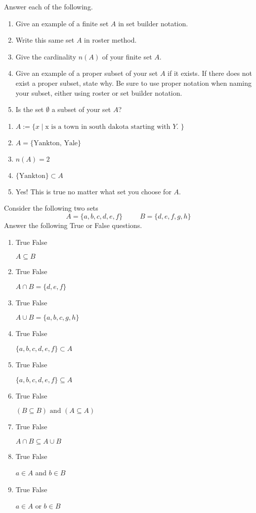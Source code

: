 \documentclass[addpoints,12pt]{exam}
\newcommand{\tft}{
\begin{oneparcheckboxes}
\CorrectChoice True
\choice False
	\end{oneparcheckboxes}
}
\newcommand{\tff}{
\begin{oneparcheckboxes}
\choice True
\CorrectChoice False
	\end{oneparcheckboxes}
}
\begin{document}
\begin{questions}
	\question Answer each of the following. \begin{enumerate}[label=\alph*)]
	    \item Give an example of a finite set $A$ in set builder notation. 
			\item Write this same set $A$ in roster method. 
			\item Give the cardinality $n(A)$ of your finite set $A$. 
			\item Give an example of a proper subset of your set $A$ if it exists. If there does not exist a proper subset, state why. Be sure to use proper notation when naming your subset, either using roster or set builder notation. 
			\item Is the set $\emptyset$ a subset of your set $A$?
	\end{enumerate}

	\begin{solution}
	    \begin{enumerate}[label = \alph*)]
	        \item  $A:= \{x\mid \text{x is a town in south dakota starting with $Y$. }\}$
					\item $A = \{\text{Yankton, Yale}\}$
					\item $n(A)=2$
					\item $\{\text{Yankton}\} \subset A$ 
					\item Yes! This is true no matter what set you choose for $A$. 
	    \end{enumerate}
	\end{solution}

	\question Consider the following two sets 
	\[
	A=\{a,b,c,d,e,f\} \hspace{30pt} B = \{d,e,f,g,h\}
	\]
	Answer the following True or False questions. 
	\begin{enumerate}[label = \alph*)]
		\item \tff $A\subseteq B$
		\item \tft $A\cap B = \{d,e,f\}$
		\item \tff $A\cup B = \{a,b,c,g,h\}$
		\item \tff $\{a,b,c,d,e,f\}\subset A$
		\item \tft $\{a,b,c,d,e,f\} \subseteq A$ 
		\item \tft $(B\subseteq B) \text{ and } (A\subseteq A)$ 
		\item \tft $A\cap B \subseteq A\cup B$
		\item \tff $a\in A$ and $b\in B$ 
		\item \tft $a\in A$ or $b\in B$ 
	\end{enumerate}


\end{questions}
\end{document}
